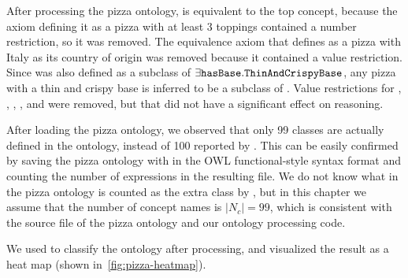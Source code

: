 
After processing the pizza ontology,  is equivalent to the top concept, because the axiom defining it as a pizza with at least 3 toppings contained a number restriction, so it was removed.
The equivalence axiom that defines  as a pizza with Italy as its country of origin was removed because it contained a value restriction.
Since  was also defined as a subclass of $\exists \texttt{hasBase} .\texttt{Thin\-And\-Crispy\-Base}$, any pizza with a thin and crispy base is inferred to be a subclass of .
Value restrictions for , , , , and  were removed, but that did not have a significant effect on reasoning.

After loading the pizza ontology, we observed that only 99 classes are actually defined in the ontology, instead of 100 reported by \Protege{}.
This can be easily confirmed by saving the pizza ontology with \Protege{} in the OWL functional-style syntax format and counting the number of  expressions in the resulting file.
We do not know what in the pizza ontology is counted as the extra class by \Protege{}, but in this chapter we assume that the number of concept names is $|N_c| = 99$, which is consistent with the source file of the pizza ontology and our ontology processing code.

We used \factpp{} to classify the ontology after processing, and visualized the result as a heat map (shown in~\autoref{fig:pizza-heatmap}).
 
